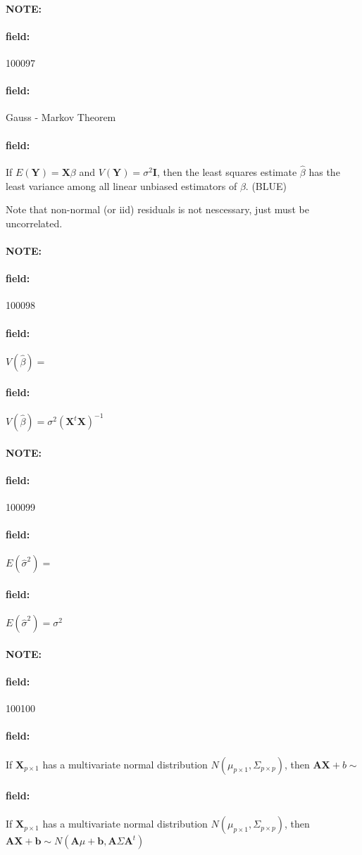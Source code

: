 \documentclass[12pt]{article}
\newenvironment{note}{\paragraph{NOTE:}}{}
\newenvironment{field}{\paragraph{field:}}{}
\begin{document}
\begin{note} \begin{field} \tiny 100097 \end{field}
 \begin{field}
  Gauss - Markov Theorem
 \end{field}
 \begin{field}
  If $E(\mathbf{Y}) = \mathbf{X}\beta$ and $V(\mathbf{Y}) = \sigma^2 \mathbf{I}$, then the least squares estimate $\hat{\beta}$ has the least variance among all linear unbiased estimators of $\beta$. (BLUE)

  Note that non-normal (or iid) residuals is not nescessary, just must be uncorrelated.
 \end{field}
\end{note}



\begin{note} \begin{field} \tiny 100098 \end{field}
 \begin{field}
  $V(\hat{\beta}) = $
 \end{field}
 \begin{field}
  $V(\hat{\beta}) = \sigma^2 (\mathbf{X}^t \mathbf{X})^{-1}$
 \end{field}
\end{note}

\begin{note} \begin{field} \tiny 100099 \end{field}
 \begin{field}
  $E(\hat{\sigma}^2) = $
 \end{field}
 \begin{field}
  $E(\hat{\sigma}^2) = \sigma^2$
 \end{field}
\end{note}

\begin{note} \begin{field} \tiny 100100 \end{field}
 \begin{field}
  If $\mathbf{X}_{p \times 1}$ has a multivariate normal distribution $N(\mu_{p\times 1}, \Sigma_{p \times p})$, then $\mathbf{AX} + b \sim $
 \end{field}
 \begin{field}
  If $\mathbf{X}_{p \times 1}$ has a multivariate normal distribution $N(\mu_{p\times 1}, \Sigma_{p \times p})$, then $\mathbf{AX} + \mathbf{b} \sim N(\mathbf{A}\mu + \mathbf{b}, \mathbf{A}\Sigma \mathbf{A}^t)$



 \end{field}
\end{note}
\end{document}
